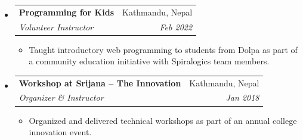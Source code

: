 \documentclass[a4paper,10pt]{article}
\makeatletter
\newcommand{\resumeItem}[1]{
  \item\small{#1 \vspace{-2pt}}
}
\newcommand{\resumeSubheading}[4]{
  \vspace{-1pt}\item
    \begin{tabular*}{0.97\textwidth}{l@{\extracolsep{\fill}}r}
      \textbf{#1} & #2 \\
      \textit{\small #3} & \textit{\small #4} \\
    \end{tabular*}\vspace{-5pt}
}
\newcommand{\resumeSubHeadingListStart}{
  \begin{itemize}[leftmargin=*, label={}]
}
\newcommand{\resumeSubHeadingListEnd}{
  \end{itemize}
}
\newcommand{\resumeItemListStart}{
  \begin{itemize}[leftmargin=15pt]
}
\newcommand{\resumeItemListEnd}{
  \end{itemize}\vspace{-5pt}
}
\makeatother
\begin{document}
\resumeSubHeadingListStart

\resumeSubheading
{Programming for Kids}
{Kathmandu, Nepal}
{Volunteer Instructor}{Feb 2022}

\resumeItemListStart

\resumeItem{
Taught introductory web programming to students from Dolpa as part
of a community education initiative with Spiralogics team members.
}

\resumeItemListEnd


\vspace{8pt}

\resumeSubheading
{Workshop at Srijana -- The Innovation}
{Kathmandu, Nepal}
{Organizer \& Instructor}{Jan 2018}

\resumeItemListStart

\resumeItem{
Organized and delivered technical workshops as part of an annual
college innovation event.
}

\resumeItemListEnd

\resumeSubHeadingListEnd
\end{document}
